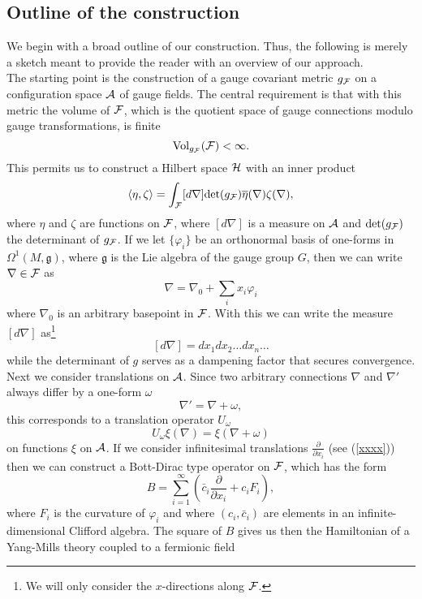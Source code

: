 \documentclass[letterpaper,11pt]{article}
\def\OO{\Omega}
\def\ca{{\cal A}}
\def\cf{{\cal F}}
\def\ch{{\cal H}}
\newcommand{\pa}{\partial}
\begin{document}
\subsection{Outline of the construction}



We begin with a broad outline of 
our construction. Thus, the following is merely a sketch meant to provide the reader with an overview of our approach.\\

The starting point is the construction of a gauge covariant metric $g_\cf$ on a configuration space $\ca$ of gauge fields. The central requirement is that with this metric the volume of $\cf$, which is the quotient space of gauge connections modulo gauge transformations, is finite
$$
\mbox{Vol}_{g_\cf}(\cf) < \infty.
$$
This permits us to construct a Hilbert space $\ch$ with an inner product
$$
\langle \eta, \zeta\rangle = \int_\cf [d\nabla] \mbox{det}(g_\cf)   \overline{\eta}(\nabla)\zeta(\nabla), 
$$
where $\eta$ and $\zeta$ are functions on $\cf$, where $[d\nabla]$ is a measure on $\ca$ and $\mbox{det}(g_\cf)$ the determinant of $g_\cf$. %
If we let $\{\varphi_i\}$ be an orthonormal basis of one-forms in $\OO^1(M,\mathfrak{g})$, where $\mathfrak{g}$ is the Lie algebra of the gauge group $G$, then we can write $\nabla\in\cf$ as
\begin{equation}
\nabla = \nabla_0 + \sum_i x_i \varphi_i
\label{xxxx}
\end{equation}
where $\nabla_0$ is an arbitrary basepoint in $\cf$. With this we can write the measure $[d\nabla]$ as\footnote{We will only consider the $x$-directions along $\cf$.}
$$
[d\nabla] = dx_1 dx_2 \ldots dx_n \ldots 
$$
while the determinant of $g$ 
serves as a dampening factor that secures convergence. 
Next we consider translations on $\ca$. Since two arbitrary connections $\nabla$ and $\nabla'$ always differ by a one-form $\omega$
$$
\nabla' = \nabla+\omega,
$$
this corresponds to a translation operator $U_\omega$
$$
U_\omega \xi(\nabla) = \xi(\nabla+\omega)
$$
on functions $\xi$ on $\ca$. 
If we consider infinitesimal translations 
$
 \frac{\pa}{\pa x_i}
$ 
(see (\ref{xxxx})) then we can construct a Bott-Dirac type operator on $\cf$, which has the form \cite{Aastrup:2019yui}
$$
B= \sum_{i=1}^\infty \left( \bar{c}_i \frac{\pa}{\pa x_i} + {c}_i F_i \right),
$$
where $F_i$ is the curvature of $\varphi_i$ and where $(c_i,\bar{c}_i)$ are elements in an infinite-dimensional Clifford algebra. The square of $B$ gives us then the Hamiltonian of a Yang-Mills theory coupled to a fermionic field
\end{document}
